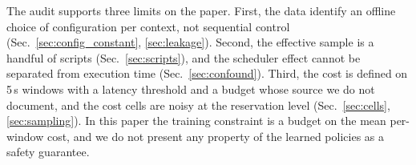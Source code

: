 The audit supports three limits on the paper.
First, the data identify an offline choice of configuration per context, not sequential control (Sec.~\ref{sec:config_constant}, \ref{sec:leakage}).%
Second, the effective sample is a handful of scripts (Sec.~\ref{sec:scripts}), and the scheduler effect cannot be separated from execution time (Sec.~\ref{sec:confound}).%
Third, the cost is defined on 5\,s windows with a latency threshold and a budget whose source we do not document, and the cost cells are noisy at the reservation level (Sec.~\ref{sec:cells}, \ref{sec:sampling}).%
In this paper the training constraint is a budget on the mean per-window cost, and we do not present any property of the learned policies as a safety guarantee.%
